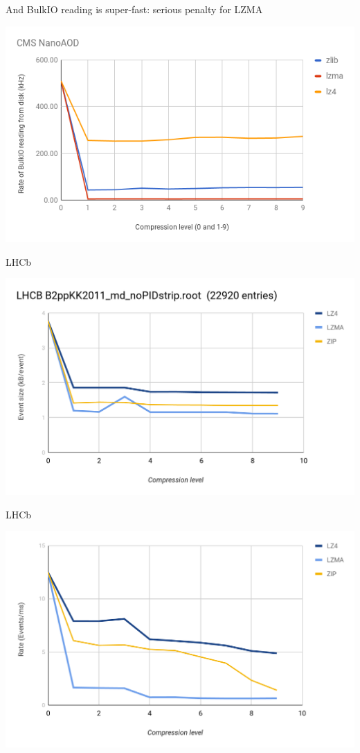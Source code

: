 \documentclass[aspectratio=169]{beamer}
\begin{document}
\begin{frame}{And BulkIO reading is super-fast: serious penalty for LZMA}
\vspace{0.1 cm}
\begin{center}
\includegraphics[width=0.9\linewidth]{bulk-vs-compression.png}
\end{center}
\end{frame}

\begin{frame}{LHCb}
\vspace{0.1 cm}
\begin{center}
\includegraphics[width=0.9\linewidth]{lhcb-eventsize.png}
\end{center}
\end{frame}

\begin{frame}{LHCb}
\vspace{0.1 cm}
\begin{center}
\includegraphics[width=0.9\linewidth]{lhcb-eventrate.png}
\end{center}
\end{frame}
\end{document}
